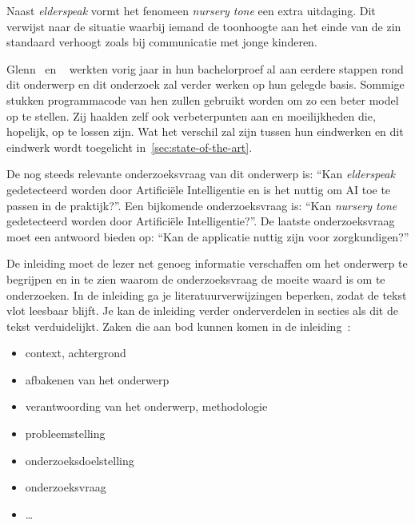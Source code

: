 Naast \textit{elderspeak} vormt het fenomeen \textit{nursery tone} een extra uitdaging. Dit verwijst naar de situatie waarbij iemand de toonhoogte aan het einde van de zin standaard verhoogt zoals bij communicatie met jonge kinderen.

Glenn~\textcite{Beeckman2021} en ~\textcite{Standaert2021} werkten vorig jaar in hun bachelorproef al aan eerdere stappen rond dit onderwerp en dit onderzoek zal verder werken op hun gelegde basis.
Sommige stukken programmacode van hen zullen gebruikt worden om zo een beter model op te stellen.
Zij haalden zelf ook verbeterpunten aan en moeilijkheden die, hopelijk, op te lossen zijn. Wat het verschil zal zijn tussen hun eindwerken en dit eindwerk wordt toegelicht in~\ref{sec:state-of-the-art}.

De nog steeds relevante onderzoeksvraag van dit onderwerp is: ``Kan \textit{elderspeak} gedetecteerd worden door Artificiële Intelligentie en is het nuttig om AI toe te passen in de praktijk?''. Een bijkomende onderzoeksvraag is: ``Kan \textit{nursery tone} gedetecteerd worden door Artificiële Intelligentie?''. De laatste onderzoeksvraag moet een antwoord bieden op: ``Kan de applicatie nuttig zijn voor zorgkundigen?''

\color{blue}
De inleiding moet de lezer net genoeg informatie verschaffen om het onderwerp te begrijpen en in te zien waarom de onderzoeksvraag de moeite waard is om te onderzoeken. In de inleiding ga je literatuurverwijzingen beperken, zodat de tekst vlot leesbaar blijft. Je kan de inleiding verder onderverdelen in secties als dit de tekst verduidelijkt. Zaken die aan bod kunnen komen in de inleiding~\autocite{Pollefliet2011}:

\begin{itemize}
  \item context, achtergrond
  \item afbakenen van het onderwerp
  \item verantwoording van het onderwerp, methodologie
  \item probleemstelling
  \item onderzoeksdoelstelling
  \item onderzoeksvraag
  \item \ldots
\end{itemize}

\color{black}

\section{}
\label{sec:probleemstelling}


